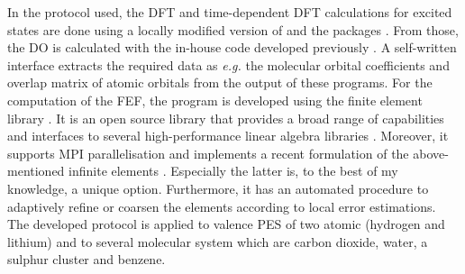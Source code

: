 In the protocol used, the DFT and time-dependent DFT calculations for excited states are done using a locally modified version of  \cite{nwchem} and the  packages \cite{g09}.
From those, the DO is calculated with the in-house code  developed previously \cite{MAgg}.
A self-written interface extracts the required data as \textit{e.g.} the molecular orbital coefficients and overlap matrix of atomic orbitals from the output of these programs.
For the computation of the FEF, the program  \cite{FreeWilly} is developed using the finite element library  \cite{libmesh}. 
It is an open source library that provides a broad range of capabilities and interfaces to several high-performance linear algebra libraries \cite{slepc1,slepc2,petsc}.
Moreover, it supports MPI parallelisation and implements a recent formulation of the above-mentioned infinite elements \cite{dreyer}.
Especially the latter is, to the best of my knowledge, a unique option.
Furthermore, it has an automated procedure to adaptively refine or coarsen the elements according to local error estimations.
%
The developed protocol is applied to valence PES of two atomic (hydrogen and lithium) and to several molecular system which are carbon dioxide, water, a sulphur cluster and benzene.
